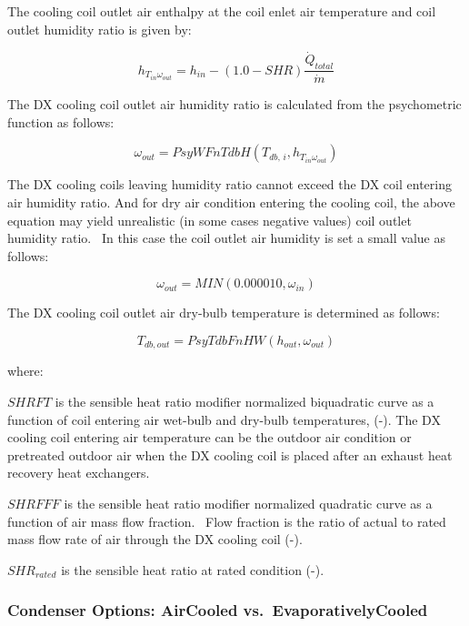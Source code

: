 The cooling coil outlet air enthalpy at the coil enlet air temperature and coil outlet humidity ratio is given by:

\begin{equation}
{h_{{T_{in}}{\omega_{out}}}} = {h_{in}} - \left( {1.0 - SHR} \right)\frac{{{{\dot Q}_{total}}}}{{\dot m}}
\end{equation}

The DX cooling coil outlet air humidity ratio is calculated from the psychometric function as follows:

\begin{equation}
{\omega_{out}} = PsyWFnTdbH\left( {{T_{db,\,i}},{h_{{T_{in}}{\omega_{out}}}}} \right)
\end{equation}

The DX cooling coils leaving humidity ratio cannot exceed the DX coil entering air humidity ratio. And for dry air condition entering the cooling coil, the above equation may yield unrealistic (in some cases negative values) coil outlet humidity ratio.~ In this case the coil outlet air humidity is set a small value as follows:

\begin{equation}
{\omega_{out}} = MIN\left( {0.000010,{\omega_{in}}} \right)
\end{equation}

The DX cooling coil outlet air dry-bulb temperature is determined as follows:

\begin{equation}
{T_{db,out}} = PsyTdbFnHW\left( {{h_{out}},{\omega_{out}}} \right)
\end{equation}

where:

\(SHRFT\) is the sensible heat ratio modifier normalized biquadratic curve as a function of coil entering air wet-bulb and dry-bulb temperatures, (-). The DX cooling coil entering air temperature can be the outdoor air condition or pretreated outdoor air when the DX cooling coil is placed after an exhaust heat recovery heat exchangers.

\(SHRFFF\) is the sensible heat ratio modifier normalized quadratic curve as a function of air mass flow fraction.~ Flow fraction is the ratio of actual to rated mass flow rate of air through the DX cooling coil (-).

\(SH{R_{rated}}\) is the sensible heat ratio at rated condition (-).

\subsubsection{Condenser Options: AirCooled vs.~EvaporativelyCooled}\label{condenser-options-aircooled-vs.evaporativelycooled}

